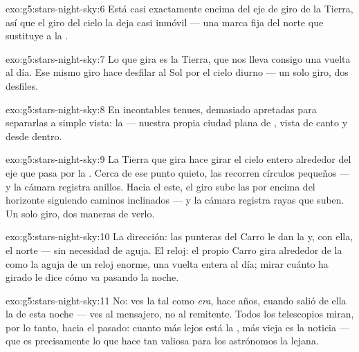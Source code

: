\begin{solution}{exo:g5:stars-night-sky:6}
Está casi exactamente encima del eje de giro de la Tierra, así que el
giro del cielo la deja casi inmóvil --- una marca fija del norte que
sustituye a la .
\end{solution}

\begin{solution}{exo:g5:stars-night-sky:7}
Lo que gira es la Tierra, que nos lleva consigo una vuelta al día. Ese
mismo giro hace desfilar al Sol por el cielo diurno --- un solo giro,
dos desfiles.
\end{solution}

\begin{solution}{exo:g5:stars-night-sky:8}
En incontables  tenues, demasiado apretadas para separarlas a
simple vista: la  --- nuestra propia ciudad plana de
, vista de canto y desde dentro.
\end{solution}

\begin{solution}{exo:g5:stars-night-sky:9}
La Tierra que gira hace girar el cielo entero alrededor del eje que
pasa por la . Cerca de ese punto quieto, las
 recorren círculos pequeños --- y la cámara registra
anillos. Hacia el este, el giro sube las  por encima del
horizonte siguiendo caminos inclinados --- y la cámara registra rayas
que suben. Un solo giro, dos maneras de verlo.
\end{solution}

\begin{solution}{exo:g5:stars-night-sky:10}
La dirección: las punteras del Carro le dan la  y,
con ella, el norte --- sin necesidad de aguja. El reloj: el propio
Carro gira alrededor de la  como la aguja de un reloj
enorme, una vuelta entera al día; mirar cuánto ha girado le dice cómo
va pasando la noche.
\end{solution}

\begin{solution}{exo:g5:stars-night-sky:11}
No: ves la  tal como \emph{era}, hace años, cuando salió de
ella la  de esta noche --- ves al mensajero, no al remitente.
Todos los telescopios miran, por lo tanto, hacia el pasado: cuanto más
lejos está la , más vieja es la noticia --- que es
precisamente lo que hace tan valiosa para los astrónomos la 
lejana.
\end{solution}
